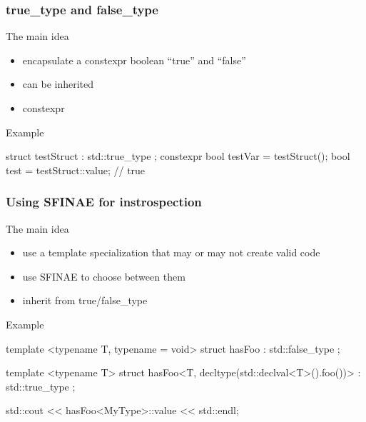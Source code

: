 \begin{frame}[fragile]
  \frametitle{true\_type and false\_type}
  \begin{block}{The main idea}
    \begin{itemize}
    \item encapsulate a constexpr boolean ``true'' and ``false''
    \item can be inherited
    \item constexpr
    \end{itemize}
  \end{block}
  \begin{exampleblock}{Example}
    \begin{cppcode*}{}
      struct testStruct : std::true_type { };
      constexpr bool testVar = testStruct();
      bool test = testStruct::value; // true
    \end{cppcode*}
  \end{exampleblock}  
\end{frame}

\begin{frame}[fragile]
  \frametitle{Using SFINAE for instrospection}
  \begin{block}{The main idea}
    \begin{itemize}
    \item use a template specialization that may or may not create valid code
    \item use SFINAE to choose between them
    \item inherit from true/false\_type
    \end{itemize}
  \end{block}
  \begin{exampleblock}{Example}
    \begin{cppcode*}{}
      template <typename T, typename = void>
      struct hasFoo : std::false_type {};

      template <typename T>
      struct hasFoo<T, decltype(std::declval<T>().foo())>
        : std::true_type {};

      std::cout << hasFoo<MyType>::value << std::endl;
    \end{cppcode*}
  \end{exampleblock}  
\end{frame}

